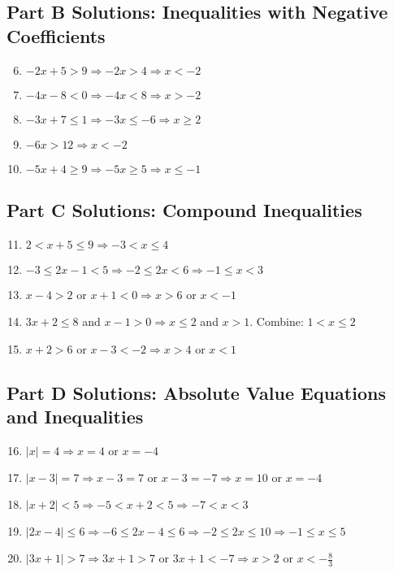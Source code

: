 \documentclass[14pt]{extarticle}
\begin{document}
\subsection*{Part B Solutions: Inequalities with Negative Coefficients}
\begin{enumerate}
    \setcounter{enumi}{5}
    \item \(-2x + 5 > 9 \Rightarrow -2x > 4 \Rightarrow x < \boxed{-2}\)
    \item \(-4x - 8 < 0 \Rightarrow -4x < 8 \Rightarrow x > \boxed{-2}\)
    \item \(-3x + 7 \le 1 \Rightarrow -3x \le -6 \Rightarrow x \ge \boxed{2}\)
    \item \(-6x > 12 \Rightarrow x < \boxed{-2}\)
    \item \(-5x + 4 \ge 9 \Rightarrow -5x \ge 5 \Rightarrow x \le \boxed{-1}\)
\end{enumerate}

\subsection*{Part C Solutions: Compound Inequalities}
\begin{enumerate}
    \setcounter{enumi}{10}
    \item \(2 < x + 5 \le 9 \Rightarrow -3 < x \le \boxed{4}\)
    \item \(-3 \le 2x - 1 < 5 \Rightarrow -2 \le 2x < 6 \Rightarrow -1 \le x < \boxed{3}\)
    \item \(x - 4 > 2\) or \(x + 1 < 0 \Rightarrow x > 6\) or \(x < \boxed{-1}\)
    \item \(3x + 2 \le 8\) and \(x - 1 > 0 \Rightarrow x \le 2\) and \(x > 1\). Combine: \( \boxed{1 < x \le 2}\)
    \item \(x + 2 > 6\) or \(x - 3 < -2 \Rightarrow x > 4\) or \(x < \boxed{1}\)
\end{enumerate}

\subsection*{Part D Solutions: Absolute Value Equations and Inequalities}
\begin{enumerate}
    \setcounter{enumi}{15}
    \item \(|x| = 4 \Rightarrow x = \boxed{4} \text{ or } x = \boxed{-4}\)
    \item \(|x - 3| = 7 \Rightarrow x - 3 = 7 \text{ or } x - 3 = -7 \Rightarrow x = \boxed{10} \text{ or } x = \boxed{-4}\)
    \item \(|x + 2| < 5 \Rightarrow -5 < x + 2 < 5 \Rightarrow \boxed{-7 < x < 3}\)
    \item \(|2x - 4| \le 6 \Rightarrow -6 \le 2x - 4 \le 6 \Rightarrow -2 \le 2x \le 10 \Rightarrow \boxed{-1 \le x \le 5}\)
    \item \(|3x + 1| > 7 \Rightarrow 3x + 1 > 7 \text{ or } 3x + 1 < -7 \Rightarrow x > 2 \text{ or } x < \boxed{-\tfrac{8}{3}}\)
\end{enumerate}
\end{document}
